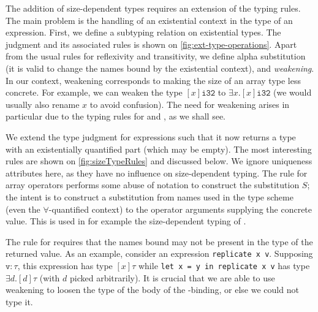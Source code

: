 The addition of size-dependent types requires an extension of the
typing rules.  The main problem is the handling of an existential
context in the type of an expression.  First, we define a subtyping
relation on existential types.  The judgment and its associated rules
is shown on \cref{fig:ext-type-operations}.  Apart from the usual
rules for reflexivity and transitivity, we define alpha substitution
(it is valid to change the names bound by the existential context),
and \textit{weakening}.  In our context, weakening corresponds to
making the size of an array type less concrete.  For example, we can
weaken the type $[x]\texttt{i32}$ to $\exists x.[x]\texttt{i32}$ (we
would usually also rename $x$ to avoid confusion).  The need for
weakening arises in particular due to the typing rules for 
and , as we shall see.

We extend the type judgment for expressions such that it now returns a
type with an existentially quantified part (which may be empty).  The
most interesting rules are shown on \cref{fig:sizeTypeRules} and
discussed below.  We ignore uniqueness attributes here, as they have
no influence on size-dependent typing.  The rule for array operators
performs some abuse of notation to construct the substitution $S$; the
intent is to construct a substitution from names used in the type
scheme (even the $\forall$-quantified context) to the operator
arguments supplying the concrete value.  This is used in for example
the size-dependent typing of .

The rule for  requires that the names bound may not be present
in the type of the returned value.  As an example, consider an
expression \lstinline{replicate x v}.  Supposing $\texttt{v}: \tau$,
this expression has type $[x]\tau$ %
while \mbox{\lstinline{let x = y in replicate x v}} has type
$\exists d.[d]\tau$ (with $d$ picked arbitrarily).  It is crucial that
we are able to use weakening to loosen the type of the body of the
-binding, or else we could not type it.

